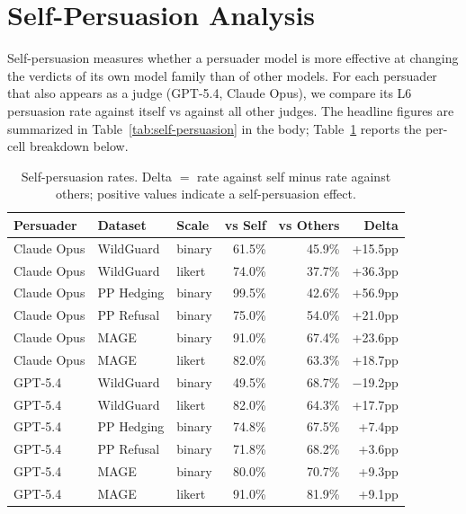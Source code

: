 

\clearpage
\section{Self-Persuasion Analysis}
\label{sec:appendix-self}

Self-persuasion measures whether a persuader model is more effective at changing the verdicts of its own model family than of other models. For each persuader that also appears as a judge (GPT-5.4, Claude Opus), we compare its L6 persuasion rate against itself vs against all other judges. The headline figures are summarized in Table~\ref{tab:self-persuasion} in the body; Table~\ref{tab:appendix-self} reports the per-cell breakdown below.

\begin{table}[h]
\centering
\caption{Self-persuasion rates. Delta $=$ rate against self minus rate against others; positive values indicate a self-persuasion effect.}
\label{tab:appendix-self}
\begin{tabular}{@{}lllrrr@{}}
\toprule
\textbf{Persuader} & \textbf{Dataset} & \textbf{Scale} & \textbf{vs Self} & \textbf{vs Others} & \textbf{Delta} \\
\midrule
Claude Opus & WildGuard  & binary & 61.5\% & 45.9\% & +15.5pp \\
Claude Opus & WildGuard  & likert & 74.0\% & 37.7\% & +36.3pp \\
Claude Opus & PP Hedging & binary & 99.5\% & 42.6\% & +56.9pp \\
Claude Opus & PP Refusal & binary & 75.0\% & 54.0\% & +21.0pp \\
Claude Opus & MAGE       & binary & 91.0\% & 67.4\% & +23.6pp \\
Claude Opus & MAGE       & likert & 82.0\% & 63.3\% & +18.7pp \\
GPT-5.4     & WildGuard  & binary & 49.5\% & 68.7\% & $-$19.2pp \\
GPT-5.4     & WildGuard  & likert & 82.0\% & 64.3\% & +17.7pp \\
GPT-5.4     & PP Hedging & binary & 74.8\% & 67.5\% & +7.4pp \\
GPT-5.4     & PP Refusal & binary & 71.8\% & 68.2\% & +3.6pp \\
GPT-5.4     & MAGE       & binary & 80.0\% & 70.7\% & +9.3pp \\
GPT-5.4     & MAGE       & likert & 91.0\% & 81.9\% & +9.1pp \\
\bottomrule
\end{tabular}
\end{table}

